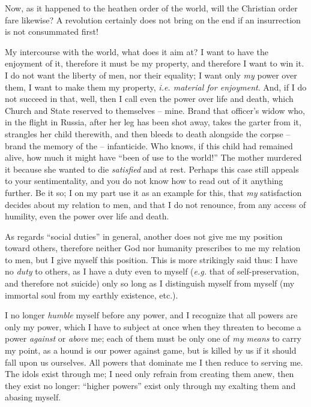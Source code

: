 \documentclass[12pt,a4paper]{book}
\begin{document}
Now, as it happened to the heathen order of the world, will the Christian 
order fare likewise? A revolution certainly does not bring on the end if an 
insurrection is not consummated first!

My intercourse with the world, what does it aim at? I want to have the 
enjoyment of it, therefore it must be my property, and therefore I want to win 
it. I do not want the liberty of men, nor their equality; I want only 
\textit{my} power over them, I want to make them my property, \textit{i.e. 
material for enjoyment}. And, if I do not succeed in that, well, then I call 
even the power over life and death, which Church and State reserved to 
themselves -- mine. Brand that officer's widow who, in the flight in Russia, 
after her leg has been shot away, takes the garter from it, strangles her 
child therewith, and then bleeds to death alongside the corpse -- brand the 
memory of the -- infanticide. Who knows, if this child had remained alive, how 
much it might have ``been of use to the world!'' The mother murdered it 
because she wanted to die \textit{satisfied} and at rest. Perhaps this case 
still appeals to your sentimentality, and you do not know how to read out of 
it anything further. Be it so; I on my part use it as an example for this, 
that \textit{my} satisfaction decides about my relation to men, and that I do 
not renounce, from any access of humility, even the power over life and death.

As regards ``social duties'' in general, another does not give me my 
position toward others, therefore neither God nor humanity prescribes to me my 
relation to men, but I give myself this position. This is more strikingly said 
thus: I have no \textit{duty} to others, as I have a duty even to myself 
(\textit{e.g.} that of self-preservation, and therefore not suicide) only so 
long as I distinguish myself from myself (my immortal soul from my earthly 
existence, etc.).

I no longer \textit{humble} myself before any power, and I recognize that all 
powers are only my power, which I have to subject at once when they threaten 
to become a power \textit{against} or \textit{above} me; each of them must be 
only one of \textit{my means} to carry my point, as a hound is our power 
against game, but is killed by us if it should fall upon us ourselves. All 
powers that dominate me I then reduce to serving me. The idols exist through 
me; I need only refrain from creating them anew, then they exist no longer: 
``higher powers'' exist only through my exalting them and abasing myself.
\end{document}
